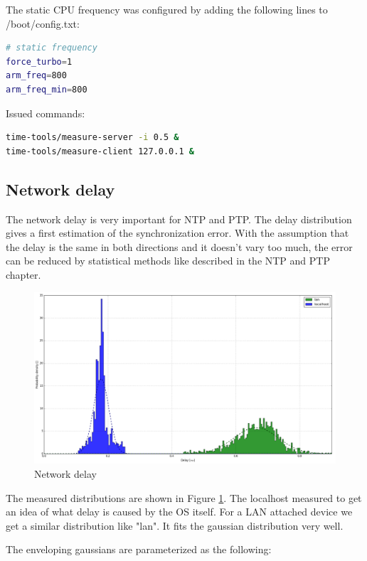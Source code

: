 The static CPU frequency was configured by adding the following lines to /boot/config.txt:
\begin{lstlisting}[language=bash]
# static frequency
force_turbo=1
arm_freq=800
arm_freq_min=800
\end{lstlisting}

Issued commands:

\begin{lstlisting}[language=bash]
time-tools/measure-server -i 0.5 &
time-tools/measure-client 127.0.0.1 &
\end{lstlisting}

\subsection{Network delay}

The network delay is very important for NTP and PTP. The delay distribution gives a first estimation of the synchronization error. With the assumption that the delay is the same in both directions and it doesn't vary too much, the error can be reduced by statistical methods like described in the NTP and PTP chapter.

\begin{figure}[H]
	\centering
	\includegraphics[width=1.0\textwidth]{figures/plot_network.png}
	\caption{Network delay}
	\label{fig:plot_network}
\end{figure}

The measured distributions are shown in Figure \ref{fig:plot_network}. The localhost measured to get an idea of what delay is caused by the OS itself. For a LAN attached device we get a similar distribution like "lan". It fits the gaussian distribution very well.

The enveloping gaussians are parameterized as the following:

